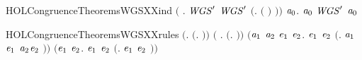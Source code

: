 \begin{SaveVerbatim}{HOLCongruenceTheoremsWGSXXind}
       \ensuremath{(}\HOLSymConst{\HOLTokenForall{}} . \ensuremath{\HOLBoundVar{WGS}\sp{\prime}}  \HOLSymConst{\HOLTokenImp{}} \ensuremath{\HOLBoundVar{WGS}\sp{\prime}} \ensuremath{(}\HOLTokenLambda{}.  \ensuremath{(} \ensuremath{)} \ensuremath{)}\ensuremath{)} \HOLSymConst{\HOLTokenImp{}}
       \HOLSymConst{\HOLTokenForall{}}\ensuremath{\HOLBoundVar{a}\sb{\mathrm{0}}}.  \ensuremath{\HOLBoundVar{a}\sb{\mathrm{0}}} \HOLSymConst{\HOLTokenImp{}} \ensuremath{\HOLBoundVar{WGS}\sp{\prime}} \ensuremath{\HOLBoundVar{a}\sb{\mathrm{0}}}
\end{SaveVerbatim}
\newcommand{\HOLCongruenceTheoremsWGSXXind}{\UseVerbatim{HOLCongruenceTheoremsWGSXXind}}
\begin{SaveVerbatim}{HOLCongruenceTheoremsWGSXXrules}
\HOLTokenTurnstile{} \ensuremath{(}\HOLSymConst{\HOLTokenForall{}}.  \ensuremath{(}\HOLTokenLambda{}. \ensuremath{)}\ensuremath{)} \HOLSymConst{\HOLTokenConj{}} \ensuremath{(}\HOLSymConst{\HOLTokenForall{}} .   \HOLSymConst{\HOLTokenImp{}}  \ensuremath{(}\HOLTokenLambda{}. \HOLSymConst{\ensuremath{\ldotp}} \ensuremath{)}\ensuremath{)} \HOLSymConst{\HOLTokenConj{}}
   \ensuremath{(}\HOLSymConst{\HOLTokenForall{}}\ensuremath{\HOLBoundVar{a}\sb{\mathrm{1}}} \ensuremath{\HOLBoundVar{a}\sb{\mathrm{2}}} \ensuremath{\HOLBoundVar{e}\sb{\mathrm{1}}} \ensuremath{\HOLBoundVar{e}\sb{\mathrm{2}}}.
         \ensuremath{\HOLBoundVar{e}\sb{\mathrm{1}}} \HOLSymConst{\HOLTokenConj{}}  \ensuremath{\HOLBoundVar{e}\sb{\mathrm{2}}} \HOLSymConst{\HOLTokenImp{}}  \ensuremath{(}\HOLTokenLambda{}. \ensuremath{\HOLBoundVar{a}\sb{\mathrm{1}}}\HOLSymConst{\ensuremath{\ldotp}}\ensuremath{\HOLBoundVar{e}\sb{\mathrm{1}}}  \HOLSymConst{\ensuremath{+}} \ensuremath{\HOLBoundVar{a}\sb{\mathrm{2}}}\HOLSymConst{\ensuremath{\ldotp}}\ensuremath{\HOLBoundVar{e}\sb{\mathrm{2}}} \ensuremath{)}\ensuremath{)} \HOLSymConst{\HOLTokenConj{}}
   \ensuremath{(}\HOLSymConst{\HOLTokenForall{}}\ensuremath{\HOLBoundVar{e}\sb{\mathrm{1}}} \ensuremath{\HOLBoundVar{e}\sb{\mathrm{2}}}.  \ensuremath{\HOLBoundVar{e}\sb{\mathrm{1}}} \HOLSymConst{\HOLTokenConj{}}  \ensuremath{\HOLBoundVar{e}\sb{\mathrm{2}}} \HOLSymConst{\HOLTokenImp{}}  \ensuremath{(}\HOLTokenLambda{}. \ensuremath{\HOLBoundVar{e}\sb{\mathrm{1}}}  \HOLSymConst{\ensuremath{\mid}} \ensuremath{\HOLBoundVar{e}\sb{\mathrm{2}}} \ensuremath{)}\ensuremath{)} \HOLSymConst{\HOLTokenConj{}}

\end{SaveVerbatim}
